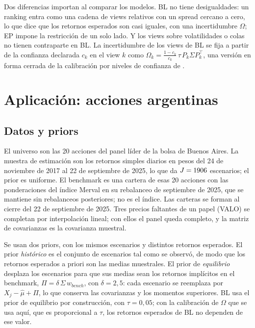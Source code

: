 \documentclass[11pt]{article}
\begin{document}
Dos diferencias importan al comparar los modelos. BL no tiene
desigualdades: un ranking entra como una cadena de views relativos con un
spread cercano a cero, lo que dice que los retornos esperados son casi
iguales, con una incertidumbre $\Omega$; EP impone la restricci\'on de un
solo lado. Y los views sobre volatilidades o colas no tienen contraparte
en BL. La incertidumbre de los views de BL se fija a partir de la confianza
declarada $c_k$ en el view $k$ como
$\Omega_k = \frac{1-c_k}{c_k}\,\tau\, P_k \Sigma P_k^\top$, una versi\'on en
forma cerrada de la calibraci\'on por niveles de confianza de
\citet{Idzorek2007}.

\section{Aplicaci\'on: acciones argentinas}\label{sec:empirical}

\subsection{Datos y priors}

El universo son las 20 acciones del panel l\'ider de la bolsa de Buenos
Aires. La muestra de estimaci\'on son los retornos simples diarios en pesos
del 24 de noviembre de 2017 al 22 de septiembre de 2025, lo que da
$J = 1906$ escenarios; el prior es uniforme. El benchmark es una cartera de
esas 20 acciones con las ponderaciones del \'indice Merval en su rebalanceo
de septiembre de 2025, que se mantiene sin rebalanceos posteriores; no es
el \'indice.
Las carteras se forman al cierre del 22 de septiembre de 2025. Tres
precios faltantes de un papel (VALO) se completan por interpolaci\'on
lineal; con ellos el panel queda completo, y la matriz de covarianzas es
la covarianza muestral.

Se usan dos priors, con los mismos escenarios y distintos retornos
esperados. El prior \emph{hist\'orico} es el conjunto de escenarios tal como
se observ\'o, de modo que los retornos esperados a priori son las medias
muestrales. El prior de \emph{equilibrio} desplaza los escenarios para que
sus medias sean los retornos impl\'icitos en el benchmark,
$\Pi = \delta\,\Sigma\, w_{bench}$, con $\delta = 2{,}5$: cada escenario se
reemplaza por $X_j - \hat\mu + \Pi$, lo que conserva las covarianzas y los
momentos superiores. BL usa el prior de equilibrio por construcci\'on, con
$\tau = 0{,}05$; con la calibraci\'on de $\Omega$ que se usa aqu\'i, que es
proporcional a $\tau$, los retornos esperados de BL no dependen de ese
valor.
\end{document}
